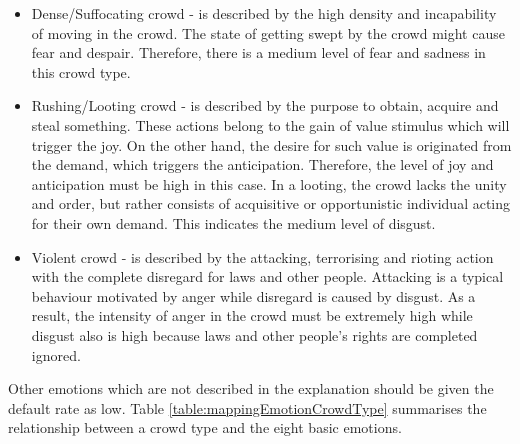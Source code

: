 \begin{itemize}
\item Dense/Suffocating crowd - is described by the high density and incapability of moving in the crowd. The state of getting swept by the crowd might cause fear and despair. Therefore, there is a medium level of fear and sadness in this crowd type.
\item Rushing/Looting crowd - is described by the purpose to obtain, acquire and steal something. These actions belong to the gain of value stimulus which will trigger the joy. On the other hand, the desire for such value is originated from the demand, which triggers the anticipation. Therefore, the level of joy and anticipation must be high in this case. In a looting, the crowd lacks the unity and order, but rather consists of acquisitive or opportunistic individual acting for their own demand. This indicates the medium level of disgust.
\item Violent crowd - is described by the attacking, terrorising and rioting action with the complete disregard for laws and other people. Attacking is a typical behaviour motivated by anger while disregard is caused by disgust. As a result, the intensity of anger in the crowd must be extremely high while disgust also is high because laws and other people's rights are completed ignored.
\end{itemize}

Other emotions which are not described in the explanation should be given the default rate as low. Table \ref{table:mappingEmotionCrowdType} summarises the relationship between a crowd type and the eight basic emotions.


